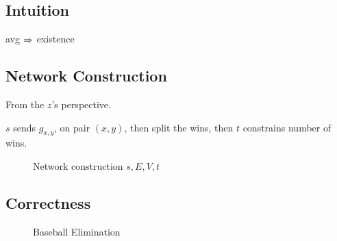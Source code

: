 \documentclass[a4paper]{report}
\theoremstyle{definition}
\begin{document}
\subsection{Intuition}
avg $\Rightarrow$ existence 

\subsection{Network Construction}
From the $z$'s perspective.

$s$ sends $g_{x,y}$, on pair $(x,y)$, then split the wins, then $t$ constrains number of wins.

\begin{figure}[!htp]
\centering
{}
\caption{Network construction $s, E, V, t$}
\label{fig:baseball01}
\end{figure}

\subsection{Correctness}
\begin{figure}[!htp]
\centering
{}
\caption{Baseball Elimination}
\label{fig:baseball}
\end{figure}
\end{document}

